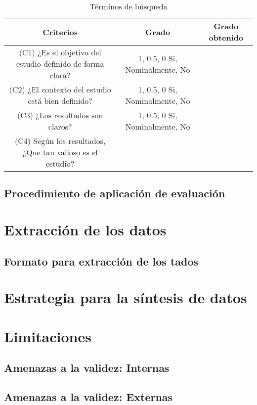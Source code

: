 \documentclass{article}
\begin{document}
\begin{table}[ht]
        \caption{Términos de búsqueda} 
        \centering 
        \begin{tabular}{c c c}
                \hline
                Criterios & Grado & Grado obtenido\\ [0.5ex]
                \hline 
                (C1) ¿Es el objetivo del estudio definido de forma clara? & {1, 0.5, 0} {Si, Nominalmente, No} \\
                \hline
                (C2) ¿El contexto del estudio está bien definido? & {1, 0.5, 0} {Si, Nominalmente, No} \\
                \hline 
                (C3) ¿Los resultados son claros? & {1, 0.5, 0} {Si, Nominalmente, No} \\
                \hline
                (C4) Según los resultados, ¿Que tan valioso es el estudio? \\
                \hline 
        \end{tabular}
        \label{table:tablaterminos}
\end{table}

\subsection{Procedimiento de aplicación de evaluación}
\section{Extracción de los datos}
\subsection{Formato para extracción de los tados}
\section{Estrategia para la síntesis de datos}
\section{Limitaciones}
\subsection{Amenazas a la validez: Internas}
\subsection{Amenazas a la validez: Externas}
\end{document}
